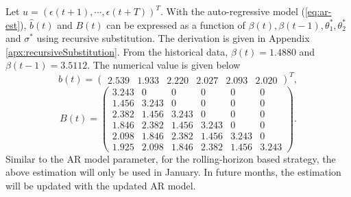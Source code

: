     Let $u = (\epsilon(t+1), \cdots, \epsilon(t+T))^T$. With the auto-regressive model (\ref{eq:ar-est}), $\hat{b}(t)$ and $B(t)$ can be expressed as a function of $\beta(t), \beta(t-1), \theta_1^*, \theta_2^*$ and $\sigma^*$ using recursive substitution. The derivation is given in Appendix \ref{apx:recursiveSubstitution}. From the historical data, $\beta(t) = 1.4880$ and $\beta(t-1)=3.5112$. The numerical value is given below
    \[
	   \hat{b}(t) = 
        \begin{pmatrix}
    	2.539 & 1.933 & 2.220 & 2.027 & 2.093 & 2.020
	   \end{pmatrix}^T,
    \]
    \[
	   B(t) = 
        \begin{pmatrix}
    	   3.243 & 0 & 0 & 0 & 0 & 0 \\
            1.456 & 3.243 & 0 & 0 & 0 & 0 \\
            2.382 & 1.456 & 3.243 & 0 & 0 & 0 \\
            1.846 & 2.382 & 1.456 & 3.243 & 0 & 0 \\
            2.098 & 1.846 & 2.382 & 1.456 & 3.243 & 0 \\
            1.925 & 2.098 & 1.846 & 2.382 & 1.456 & 3.243
        \end{pmatrix}.
    \]
    Similar to the AR model parameter, for the rolling-horizon based strategy, the above estimation will only be used in January. In future months, the estimation will be updated with the updated AR model.
